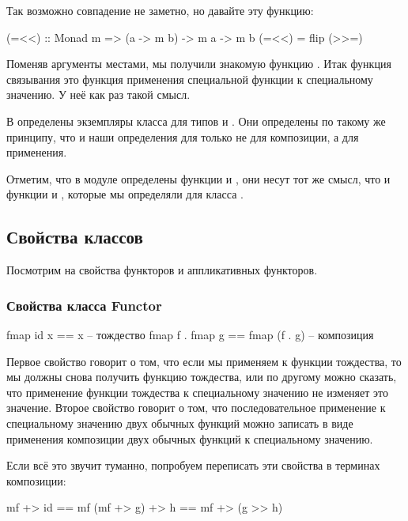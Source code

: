 Так возможно совпадение не заметно, но давайте 
эту функцию:

\begin{code}
(=<<)  :: Monad m => (a -> m b) -> m a -> m b
(=<<) = flip (>>=)
\end{code}

Поменяв аргументы местами, мы получили знакомую функцию \In{*$}.
Итак функция связывания это функция применения специальной
функции к специальному значению. У неё как раз такой смысл.

В  определены экземпляры класса 
для типов  и \In{[]}.  
Они определены по такому же принципу,
что и наши определения для  только не 
для композиции, а для применения. 

Отметим, что в модуле  определены 
функции  и , они несут тот
же смысл, что и функции  и ,
которые мы определяли для класса . 

\subsection{Свойства классов}

Посмотрим на свойства функторов и аппликативных функторов.

\subsubsection{Свойства класса Functor}

\begin{code}
fmap id x           == x                -- тождество
fmap f . fmap g     == fmap (f . g)     -- композиция
\end{code}

Первое свойство говорит о том, что если мы применяем
 к функции тождества, то мы должны снова получить
функцию тождества, или по другому можно сказать, что 
применение функции тождества к специальному значению не 
изменяет это значение. Второе свойство говорит о том, что
последовательное применение к специальному значению двух 
обычных функций можно записать в виде применения композиции
двух обычных функций к специальному значению.

Если всё это звучит туманно, попробуем переписать эти свойства
в терминах композиции:

\begin{code}
mf +> id         == mf
(mf +> g) +> h   == mf +> (g >> h)
\end{code}

